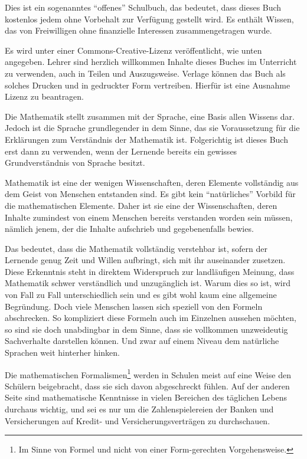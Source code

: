 \preface

Dies ist ein sogenanntes "`offenes"' Schulbuch, das bedeutet, dass dieses Buch kostenlos jedem ohne Vorbehalt zur Verfügung gestellt wird. Es enthält Wissen, das von Freiwilligen ohne finanzielle Interessen zusammengetragen wurde. 

Es wird unter einer Commons-Creative-Lizenz veröffentlicht, wie unten angegeben. Lehrer sind herzlich willkommen Inhalte dieses Buches im Unterricht zu verwenden, auch in Teilen und Auszugsweise. Verlage können das Buch als solches Drucken und in gedruckter Form vertreiben. Hierfür ist eine Ausnahme Lizenz zu beantragen. 

\bigskip

Die Mathematik stellt zusammen mit der Sprache, eine Basis allen Wissens dar. Jedoch ist die Sprache grundlegender in dem Sinne, das sie Voraussetzung für die Erklärungen zum Verständnis der Mathematik ist. Folgerichtig ist dieses Buch erst dann zu verwenden, wenn der Lernende bereits ein gewisses Grundverständnis von Sprache besitzt. 

Mathematik ist eine der wenigen Wissenschaften, deren Elemente vollständig aus dem Geist von Menschen entstanden sind. Es gibt kein "`natürliches"' Vorbild für die mathematischen Elemente. Daher ist sie eine der Wissenschaften, deren Inhalte zumindest von einem Menschen bereits verstanden worden sein müssen, nämlich jenem, der die Inhalte aufschrieb und gegebenenfalls bewies.

Das bedeutet, dass die Mathematik vollständig verstehbar ist, sofern der Lernende genug Zeit und Willen aufbringt, sich mit ihr auseinander zusetzen. Diese Erkenntnis steht in direktem Widerspruch zur landläufigen Meinung, dass Mathematik schwer verständlich und unzugänglich ist. Warum dies so ist, wird von Fall zu Fall unterschiedlich sein und es gibt wohl kaum eine allgemeine Begründung. Doch viele Menschen lassen sich speziell von den Formeln abschrecken. So kompliziert diese Formeln auch im Einzelnen aussehen möchten, so sind sie doch unabdingbar in dem Sinne, dass sie vollkommen unzweideutig Sachverhalte darstellen können. Und zwar auf einem Niveau dem natürliche Sprachen weit hinterher hinken. 

Die mathematischen Formalismen\footnote{Im Sinne von Formel und nicht von einer Form-gerechten Vorgehensweise.} werden in Schulen meist auf eine Weise den Schülern beigebracht, dass sie sich davon abgeschreckt fühlen. Auf der anderen Seite sind mathematische Kenntnisse in vielen Bereichen des täglichen Lebens durchaus wichtig, und sei es nur um die Zahlenspielereien der Banken und Versicherungen auf Kredit- und Versicherungsverträgen zu durchschauen. 

